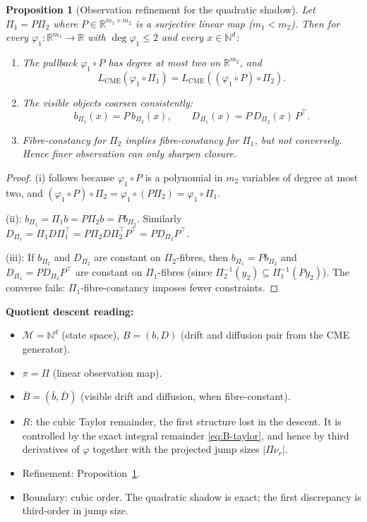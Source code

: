 \documentclass[11pt,a4paper]{article}
\numberwithin{equation}{section}
\newcommand{\R}{\mathbb{R}}
\newcommand{\N}{\mathbb{N}}
\theoremstyle{thmcompact}
\newtheorem{proposition}[theorem]{Proposition}
\theoremstyle{remark}
\begin{document}
\begin{proposition}[Observation refinement for the quadratic shadow]\label{prop:bridge-B-refine}
Let $\Pi_1 = P\Pi_2$ where $P \in \R^{m_1 \times m_2}$ is a surjective linear map ($m_1 < m_2$). Then for every $\varphi_1: \R^{m_1} \to \R$ with $\deg \varphi_1 \leq 2$ and every $x \in \N^d$:
\begin{enumerate}[label=\textup{(\roman*)}]
\item The pullback $\varphi_1 \circ P$ has degree at most two on $\R^{m_2}$, and
\[
L_{\mathrm{CME}}(\varphi_1 \circ \Pi_1) = L_{\mathrm{CME}}((\varphi_1 \circ P) \circ \Pi_2).
\]
\item The visible objects coarsen consistently:
\[
b_{\Pi_1}(x) = P\, b_{\Pi_2}(x), \qquad D_{\Pi_1}(x) = P\, D_{\Pi_2}(x)\, P^\top.
\]
\item Fibre-constancy for $\Pi_2$ implies fibre-constancy for $\Pi_1$, but not conversely. Hence finer observation can only sharpen closure.
\end{enumerate}
\end{proposition}

\begin{proof}
(i) follows because $\varphi_1 \circ P$ is a polynomial in $m_2$ variables of degree at most two, and $(\varphi_1 \circ P) \circ \Pi_2 = \varphi_1 \circ (P\Pi_2) = \varphi_1 \circ \Pi_1$.

(ii): $b_{\Pi_1} = \Pi_1 b = P\Pi_2 b = P b_{\Pi_2}$. Similarly $D_{\Pi_1} = \Pi_1 D \Pi_1^\top = P\Pi_2 D \Pi_2^\top P^\top = P D_{\Pi_2} P^\top$.

(iii): If $b_{\Pi_2}$ and $D_{\Pi_2}$ are constant on $\Pi_2$-fibres, then $b_{\Pi_1} = Pb_{\Pi_2}$ and $D_{\Pi_1} = PD_{\Pi_2}P^\top$ are constant on $\Pi_1$-fibres (since $\Pi_2^{-1}(y_2) \subseteq \Pi_1^{-1}(Py_2)$). The converse fails: $\Pi_1$-fibre-constancy imposes fewer constraints.
\end{proof}

\textbf{Quotient descent reading:}
\begin{itemize}[leftmargin=2em]
\item $\mathcal{M} = \N^d$ (state space), $B = (b, D)$ (drift and diffusion pair from the CME generator).
\item $\pi = \Pi$ (linear observation map).
\item $\bar{B} = (\bar{b}, \bar{D})$ (visible drift and diffusion, when fibre-constant).
\item $R$: the cubic Taylor remainder, the first structure lost in the descent. It is controlled by the exact integral remainder \eqref{eq:B-taylor}, and hence by third derivatives of $\varphi$ together with the projected jump sizes $|\Pi\nu_r|$.
\item Refinement: Proposition~\ref{prop:bridge-B-refine}.
\item Boundary: cubic order. The quadratic shadow is exact; the first discrepancy is third-order in jump size.
\end{itemize}
\end{document}

